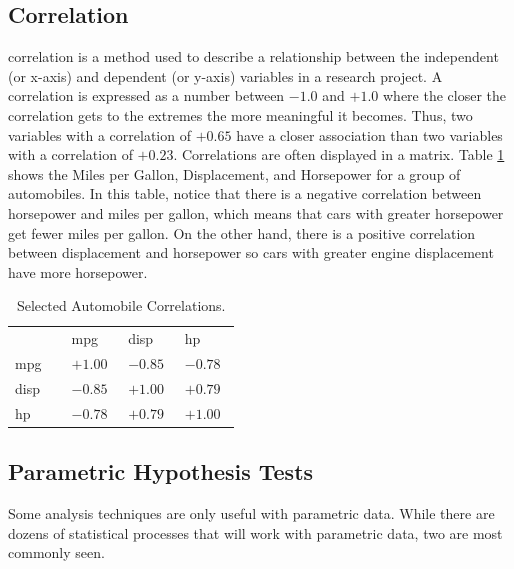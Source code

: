\subsection{Correlation}

\Gls{correlation} is a method used to describe a relationship between the independent (or x-axis) and dependent (or y-axis) variables in a research project. A correlation is expressed as a number between $ -1.0 $ and $ +1.0 $ where the closer the correlation gets to the extremes the more meaningful it becomes. Thus, two variables with a correlation of $ +0.65 $ have a closer association than two variables with a correlation of $ +0.23 $. Correlations are often displayed in a matrix. Table \ref{tab06.06} shows the Miles per Gallon, Displacement, and Horsepower for a group of automobiles. In this table, notice that there is a negative correlation between horsepower and miles per gallon, which means that cars with greater horsepower get fewer miles per gallon. On the other hand, there is a positive correlation between displacement and horsepower so cars with greater engine displacement have more horsepower.

\begin{table}[H]
	\centering
	\begin{tabularx}{0.95\linewidth}{
			p{0.22\linewidth}
			p{0.22\linewidth}
			p{0.22\linewidth}
			p{0.22\linewidth}}
		\toprule
		{}   & mpg       & disp      & hp \\
		mpg  & $ +1.00 $ & $ -0.85 $ & $ -0.78 $ \\
		disp & $ -0.85 $ & $ +1.00 $ & $ +0.79 $ \\
		hp   & $ -0.78 $ & $ +0.79 $ & $ +1.00 $ \\
		\bottomrule
	\end{tabularx}
	\caption{Selected Automobile Correlations.}
	\label{tab06.06}
\end{table}


\subsection{Parametric Hypothesis Tests}

Some analysis techniques are only useful with \gls{parametric} data. While there are dozens of statistical processes that will work with parametric data, two are most commonly seen.

